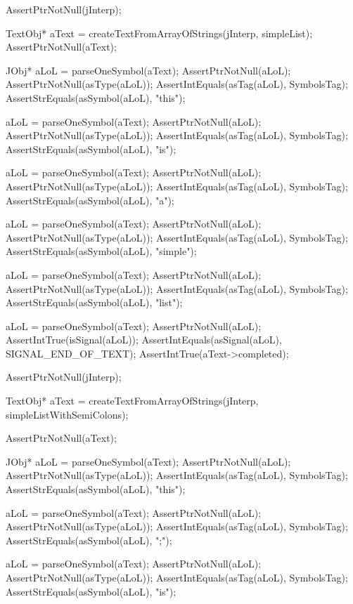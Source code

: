 \startCTest
  AssertPtrNotNull(jInterp);

  TextObj* aText =
    createTextFromArrayOfStrings(jInterp, simpleList);
  AssertPtrNotNull(aText);

  JObj* aLoL = parseOneSymbol(aText);
  AssertPtrNotNull(aLoL);
  AssertPtrNotNull(asType(aLoL));
  AssertIntEquals(asTag(aLoL), SymbolsTag);
  AssertStrEquals(asSymbol(aLoL), "this");

  aLoL = parseOneSymbol(aText);
  AssertPtrNotNull(aLoL);
  AssertPtrNotNull(asType(aLoL));
  AssertIntEquals(asTag(aLoL), SymbolsTag);
  AssertStrEquals(asSymbol(aLoL), "is");

  aLoL = parseOneSymbol(aText);
  AssertPtrNotNull(aLoL);
  AssertPtrNotNull(asType(aLoL));
  AssertIntEquals(asTag(aLoL), SymbolsTag);
  AssertStrEquals(asSymbol(aLoL), "a");

  aLoL = parseOneSymbol(aText);
  AssertPtrNotNull(aLoL);
  AssertPtrNotNull(asType(aLoL));
  AssertIntEquals(asTag(aLoL), SymbolsTag);
  AssertStrEquals(asSymbol(aLoL), "simple");

  aLoL = parseOneSymbol(aText);
  AssertPtrNotNull(aLoL);
  AssertPtrNotNull(asType(aLoL));
  AssertIntEquals(asTag(aLoL), SymbolsTag);
  AssertStrEquals(asSymbol(aLoL), "list");

  aLoL = parseOneSymbol(aText);
  AssertPtrNotNull(aLoL);
  AssertIntTrue(isSignal(aLoL));
  AssertIntEquals(asSignal(aLoL), SIGNAL_END_OF_TEXT);
  AssertIntTrue(aText->completed);
\stopCTest
\stopTestCase

\startCTest
  AssertPtrNotNull(jInterp);

  TextObj* aText =
    createTextFromArrayOfStrings(jInterp, simpleListWithSemiColons);

  AssertPtrNotNull(aText);

  JObj* aLoL = parseOneSymbol(aText);
  AssertPtrNotNull(aLoL);
  AssertPtrNotNull(asType(aLoL));
  AssertIntEquals(asTag(aLoL), SymbolsTag);
  AssertStrEquals(asSymbol(aLoL), "this");

  aLoL = parseOneSymbol(aText);
  AssertPtrNotNull(aLoL);
  AssertPtrNotNull(asType(aLoL));
  AssertIntEquals(asTag(aLoL), SymbolsTag);
  AssertStrEquals(asSymbol(aLoL), ";");

  aLoL = parseOneSymbol(aText);
  AssertPtrNotNull(aLoL);
  AssertPtrNotNull(asType(aLoL));
  AssertIntEquals(asTag(aLoL), SymbolsTag);
  AssertStrEquals(asSymbol(aLoL), "is");

